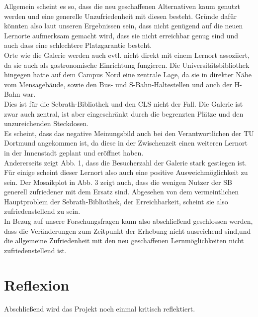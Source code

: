 \documentclass[11pt, a4paper]{article}
\begin{document}
Allgemein scheint es so, dass die neu geschaffenen Alternativen kaum genutzt werden und eine generelle Unzufriedenheit mit diesen besteht. Gründe dafür könnten also laut unseren Ergebnissen sein, dass nicht genügend auf die neuen Lernorte aufmerksam gemacht wird, dass sie nicht erreichbar genug sind und auch dass eine schlechtere Platzgarantie besteht.\\

Orte wie die Galerie werden auch evtl. nicht direkt mit einem Lernort assoziiert, da sie auch als gastronomische Einrichtung fungieren. Die Universitätsbibliothek hingegen hatte auf dem Campus Nord eine zentrale Lage, da sie in direkter Nähe vom Mensagebäude, sowie den Bus- und S-Bahn-Haltestellen und auch der H-Bahn war.\\

Dies ist für die Sebrath-Bibliothek und den CLS nicht der Fall. Die Galerie ist zwar auch zentral, ist aber eingeschränkt durch die begrenzten Plätze und den unzureichenden Steckdosen.\\


Es scheint, dass das negative Meinungsbild auch bei den Verantwortlichen der TU Dortmund angekommen ist, da diese in der Zwischenzeit einen weiteren Lernort in der Innenstadt geplant und eröffnet haben.\\

Andererseits zeigt Abb. 1, dass die Besucherzahl der Galerie stark gestiegen ist. 
Für einige scheint dieser Lernort also auch eine positive Ausweichmöglichkeit zu sein.
Der Mosaikplot in Abb. 3 zeigt auch, dass die wenigen Nutzer der SB generell zufriedener mit dem Ersatz sind. Abgesehen von dem vermeintlichen Hauptproblem der Sebrath-Bibliothek, der Erreichbarkeit, scheint sie also zufriedenstellend zu sein.\\

In Bezug auf unsere Forschungsfragen kann also abschließend geschlossen werden, dass die Veränderungen zum Zeitpunkt der Erhebung nicht ausreichend sind,und die allgemeine Zufriedenheit mit den neu geschaffenen Lernmöglichkeiten nicht zufriedenstellend ist.



\newpage
\section{Reflexion}

Abschließend wird das Projekt noch einmal kritisch reflektiert. \\
\end{document}

